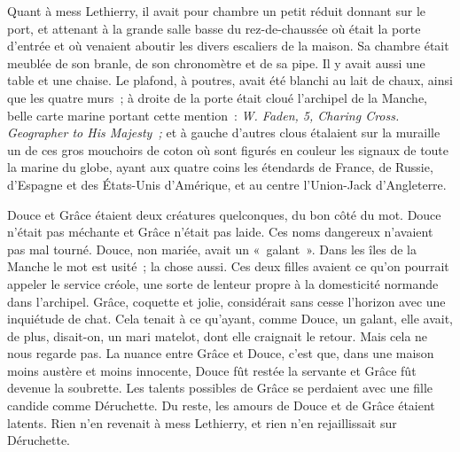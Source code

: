 \documentclass[french,twoside]{book} %
\begin{document}
Quant à mess Lethierry, il avait pour chambre un petit réduit donnant sur le port, et attenant à la grande salle basse du rez-de-chaussée où était la porte d’entrée et où venaient aboutir les divers escaliers de la maison. Sa chambre était meublée de son branle, de son chronomètre et de sa pipe. Il y avait aussi une table et une chaise. Le plafond, à poutres, avait été blanchi au lait de chaux, ainsi que les quatre murs ; à droite de la porte était cloué l’archipel de la Manche, belle carte marine portant cette mention : \emph{W. Faden, 5, Charing Cross. Geographer to His Majesty ;} et à gauche d’autres clous étalaient sur la muraille un de ces gros mouchoirs de coton où sont figurés en couleur les signaux de toute la marine du globe, ayant aux quatre coins les étendards de France, de Russie, d’Espagne et des États-Unis d’Amérique, et au centre l’Union-Jack d’Angleterre.\par
Douce et Grâce étaient deux créatures quelconques, du bon côté du mot. Douce n’était pas méchante et Grâce n’était pas laide. Ces noms dangereux n’avaient pas mal tourné. Douce, non mariée, avait un « galant ». Dans les îles de la Manche le mot est usité ; la chose aussi. Ces deux filles avaient ce qu’on pourrait appeler le service créole, une sorte de lenteur propre à la  domesticité normande dans l’archipel. Grâce, coquette et jolie, considérait sans cesse l’horizon avec une inquiétude de chat. Cela tenait à ce qu’ayant, comme Douce, un galant, elle avait, de plus, disait-on, un mari matelot, dont elle craignait le retour. Mais cela ne nous regarde pas. La nuance entre Grâce et Douce, c’est que, dans une maison moins austère et moins innocente, Douce fût restée la servante et Grâce fût devenue la soubrette. Les talents possibles de Grâce se perdaient avec une fille candide comme Déruchette. Du reste, les amours de Douce et de Grâce étaient latents. Rien n’en revenait à mess Lethierry, et rien n’en rejaillissait sur Déruchette.\par
\end{document}

